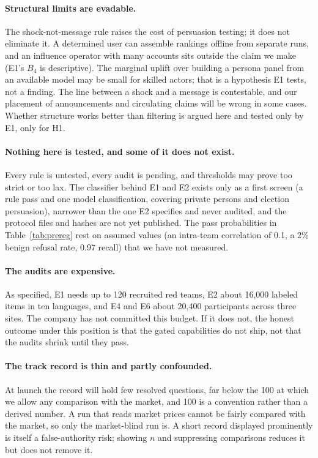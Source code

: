 \documentclass[11pt]{article}
\begin{document}
\paragraph{Structural limits are evadable.} The shock-not-message rule raises the cost of persuasion testing; it does not eliminate it. A determined user can assemble rankings offline from separate runs, and an influence operator with many accounts sits outside the claim we make (E1's $B_4$ is descriptive). The marginal uplift over building a persona panel from an available model may be small for skilled actors; that is a hypothesis E1 tests, not a finding. The line between a shock and a message is contestable, and our placement of announcements and circulating claims will be wrong in some cases. Whether structure works better than filtering is argued here and tested only by E1, only for H1.

\paragraph{Nothing here is tested, and some of it does not exist.} Every rule is untested, every audit is pending, and thresholds may prove too strict or too lax. The classifier behind E1 and E2 exists only as a first screen (a rule pass and one model classification, covering private persons and election persuasion), narrower than the one E2 specifies and never audited, and the protocol files and hashes are not yet published. The pass probabilities in Table~\ref{tab:prereg} rest on assumed values (an intra-team correlation of 0.1, a 2\% benign refusal rate, 0.97 recall) that we have not measured.

\paragraph{The audits are expensive.} As specified, E1 needs up to 120 recruited red teams, E2 about 16,000 labeled items in ten languages, and E4 and E6 about 20,400 participants across three sites. The company has not committed this budget. If it does not, the honest outcome under this position is that the gated capabilities do not ship, not that the audits shrink until they pass.

\paragraph{The track record is thin and partly confounded.} At launch the record will hold few resolved questions, far below the 100 at which we allow any comparison with the market, and 100 is a convention rather than a derived number. A run that reads market prices cannot be fairly compared with the market, so only the market-blind run is. A short record displayed prominently is itself a false-authority risk; showing $n$ and suppressing comparisons reduces it but does not remove it.
\end{document}
